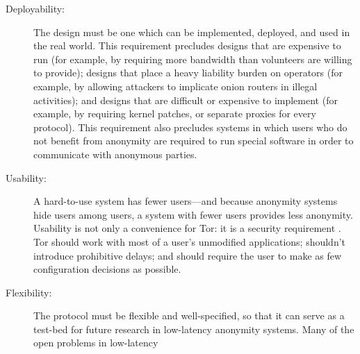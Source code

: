 \documentclass[times,10pt,twocolumn]{article}
\begin{document}
\begin{description}
\item[Deployability:] The design must be one which can be implemented,
  deployed, and used in the real world.  This requirement precludes designs
  that are expensive to run (for example, by requiring more bandwidth than
  volunteers are willing to provide); designs that place a heavy liability
  burden on operators (for example, by allowing attackers to implicate onion
  routers in illegal activities); and designs that are difficult or expensive
  to implement (for example, by requiring kernel patches, or separate proxies
  for every protocol).  This requirement also precludes systems in which
  users who do not benefit from anonymity are required to run special
  software in order to communicate with anonymous parties.
%
\item[Usability:] A hard-to-use system has fewer users---and because
  anonymity systems hide users among users, a system with fewer users
  provides less anonymity.  Usability is not only a convenience for Tor:
  it is a security requirement \cite{econymics,back01}. Tor
  should work with most of a user's unmodified applications; shouldn't
  introduce prohibitive delays; and should require the user to make as few
  configuration decisions as possible.
\item[Flexibility:] The protocol must be flexible and
  well-specified, so that it can serve as a test-bed for future research in
  low-latency anonymity systems.  Many of the open problems in low-latency

\end{description}
\end{document}
